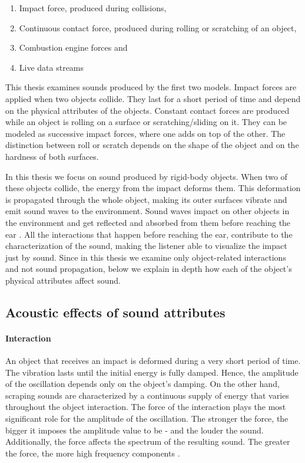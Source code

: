 \begin{enumerate}
\item Impact force, produced during collisions,
\item Continuous contact force, produced during rolling or scratching of an object,
\item Combustion engine forces and
\item Live data streams
\end{enumerate}

This thesis examines sounds produced by the first two models. Impact forces are applied when two objects collide. They last for a short period of time and depend on the physical attributes of the objects. Constant contact forces are produced while an object is rolling on a surface or scratching/sliding on it. They can be modeled as successive impact forces, where one adds on top of the other. The distinction between roll or scratch depends on the shape of the object and on the hardness of both surfaces.

In this thesis we focus on sound produced by rigid-body objects. When two of these objects collide, the energy from the impact deforms them. This deformation is propagated through the whole object, making its outer surfaces vibrate and emit sound waves to the environment. Sound waves impact on other objects in the environment and get reflected and absorbed from them before reaching the ear \cite{van1998sounds}. All the interactions that happen before reaching the ear, contribute to the characterization of the sound, making the listener able to visualize the impact just by sound. Since in this thesis we examine only object-related interactions and not sound propagation, below we explain in depth how each of the object's physical attributes affect sound.


\subsection{Acoustic effects of sound attributes}\label{sec:attributes}

\paragraph{Interaction}
\hfill \break

An object that receives an impact is deformed during a very short period of time. The vibration lasts until the initial energy is fully damped. Hence, the amplitude of the oscillation depends only on the object's damping. On the other hand, scraping sounds are characterized by a continuous supply of energy that varies throughout the object interaction. The force of the interaction plays the most significant role for the amplitude of the oscillation. The stronger the force, the bigger it imposes the amplitude value to be - and the louder the sound. Additionally, the force affects the spectrum of the resulting sound. The greater the force, the more high frequency components \cite{gaver1993world}.


